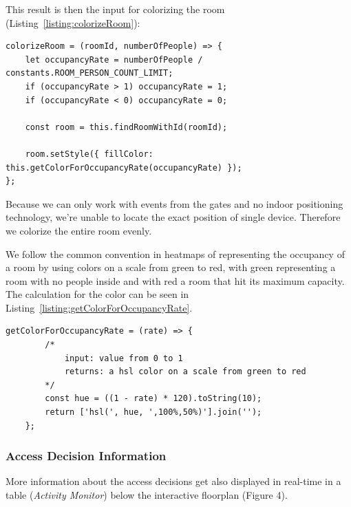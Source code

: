 This result is then the input for colorizing the room (Listing~\ref{listing:colorizeRoom}):

\begin{lstlisting}[label={listing:colorizeRoom},caption={Function for colorizing a room}]
colorizeRoom = (roomId, numberOfPeople) => {
    let occupancyRate = numberOfPeople / constants.ROOM_PERSON_COUNT_LIMIT;
    if (occupancyRate > 1) occupancyRate = 1;
    if (occupancyRate < 0) occupancyRate = 0;

    const room = this.findRoomWithId(roomId);

    room.setStyle({ fillColor: this.getColorForOccupancyRate(occupancyRate) });
};
\end{lstlisting}

Because we can only work with events from the gates and no indoor positioning technology, we're unable to locate the exact position of single device. Therefore we colorize the entire room evenly.

We follow the common convention in heatmaps of representing the occupancy of a room by using colors on a scale from green to red, with green representing a room with no people inside and with red a room that hit its maximum capacity. The calculation for the color can be seen in Listing~\ref{listing:getColorForOccupancyRate}.

\begin{lstlisting}[label={listing:getColorForOccupancyRate},caption={Function for calculating color based on occupancy}]
    getColorForOccupancyRate = (rate) => {
        /*
            input: value from 0 to 1
            returns: a hsl color on a scale from green to red
        */
        const hue = ((1 - rate) * 120).toString(10);
        return ['hsl(', hue, ',100%,50%)'].join('');
    };
\end{lstlisting}

\subsubsection{Access Decision Information}

More information about the access decisions get also displayed in real-time in a table (\emph{Activity Monitor}) below the interactive floorplan (Figure 4).

